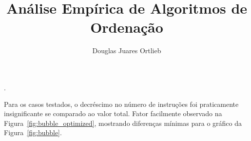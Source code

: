 \message{ !name(Artigo.tex)}\documentclass[12pt]{article}
\title{Análise Empírica de Algoritmos de Ordenação}
\author{Douglas Juares Ortlieb\inst{1} \inst{2}}
\begin{document}
 

.

Para os casos testados, o decréscimo no número de instruções foi praticamente insignificante se comparado ao valor total. Fator facilmente observado na Figura~\ref{fig:bubble_optimized}, mostrando diferenças mínimas para o gráfico da Figura~\ref{fig:bubble}.

\end{document}
